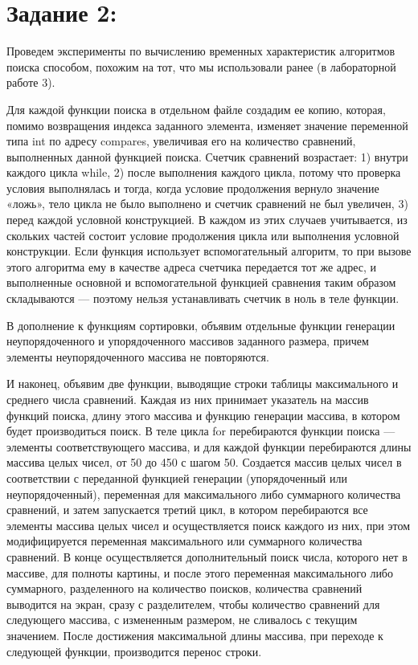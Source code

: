 \documentclass[12pt]{article}
\begin{document}
{	 
	
	\section{Задание 2:}
	\label{task_2}
	Проведем эксперименты по вычислению временных характеристик алгоритмов поиска способом, похожим на тот, что мы использовали ранее (в лабораторной работе 3). 
	
	Для каждой функции поиска в отдельном файле создадим ее копию, которая, помимо возвращения индекса заданного элемента, изменяет значение переменной типа int по адресу compares, увеличивая его на количество сравнений, выполненных данной функцией поиска. Счетчик сравнений возрастает: 1) внутри каждого цикла while, 2) после выполнения каждого цикла, потому что проверка условия выполнялась и тогда, когда условие продолжения вернуло значение «ложь», тело цикла не было выполнено и счетчик сравнений не был увеличен, 3) перед каждой условной конструкцией. В каждом из этих случаев учитывается, из скольких частей состоит условие продолжения цикла или выполнения условной конструкции. Если функция использует вспомогательный алгоритм, то при вызове этого алгоритма ему в качестве адреса счетчика передается тот же адрес, и выполненные основной и вспомогательной функцией сравнения таким образом складываются --- поэтому нельзя устанавливать счетчик в ноль в теле функции. 
	
	В дополнение к функциям сортировки, объявим отдельные функции генерации неупорядоченного и упорядоченного массивов заданного размера, причем элементы неупорядоченного массива не повторяются. 
	
	И наконец, объявим две функции, выводящие строки таблицы максимального и среднего числа сравнений. Каждая из них принимает указатель на массив функций поиска, длину этого массива и функцию генерации массива, в котором будет производиться поиск. В теле цикла for перебираются функции поиска --- элементы соответствующего массива, и для каждой функции перебираются длины массива целых чисел, от 50 до 450 с шагом 50. Создается массив целых чисел в соответствии с переданной функцией генерации (упорядоченный или неупорядоченный), переменная для максимального либо суммарного количества сравнений, и затем запускается третий цикл, в котором перебираются все элементы массива целых чисел и осуществляется поиск каждого из них, при этом модифицируется переменная максимального или суммарного количества сравнений. В конце осуществляется дополнительный поиск числа, которого нет в массиве, для полноты картины, и после этого переменная максимального либо суммарного, разделенного на количество поисков, количества сравнений выводится на экран, сразу с разделителем, чтобы количество сравнений для следующего массива, с измененным размером, не сливалось с текущим значением. После достижения максимальной длины массива, при переходе к следующей функции, производится перенос строки.
	
}
\end{document}
